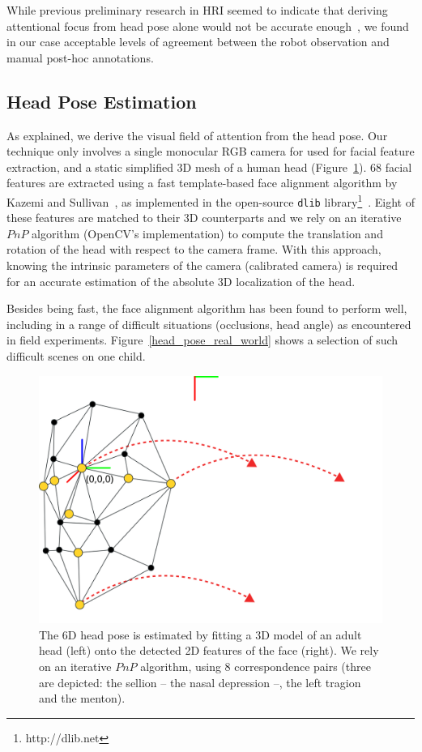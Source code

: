 \documentclass{sig-alternate}
\begin{document}
While previous preliminary research in HRI seemed to indicate that deriving
attentional focus from head pose alone would not be accurate
enough~\cite{kennedy2015head}, we found in our case acceptable levels of
agreement between the robot observation and manual post-hoc annotations.


\subsection{Head Pose Estimation}

As explained, we derive the visual field of attention from the head pose. Our
technique only involves a single monocular RGB camera for used for facial
feature extraction, and a static simplified 3D mesh of a human head
(Figure~\ref{head_pose}). 68 facial features are extracted using a fast
template-based face alignment algorithm by Kazemi and
Sullivan~\cite{kazemi2014one}, as implemented in the open-source {\tt dlib}
library\footnote{http://dlib.net}~\cite{dlib09}.  Eight of these features are
matched to their 3D counterparts and we rely on an iterative $PnP$ algorithm
(OpenCV's implementation) to compute the translation and rotation of the head
with respect to the camera frame. With this approach, knowing the intrinsic
parameters of the camera (calibrated camera) is required for an accurate
estimation of the absolute 3D localization of the head.

Besides being fast, the face alignment algorithm has been found to perform well,
including in a range of difficult situations (occlusions, head angle) as
encountered in field experiments.  Figure~\ref{head_pose_real_world} shows a
selection of such difficult scenes on one child.

\begin{figure}[t]
    \centering
    \includegraphics[width=0.9\linewidth]{head_pose}
    \caption{The 6D head pose is estimated by fitting a 3D model of an
        adult head (left) onto the detected 2D features of the face (right). We
        rely on an iterative $PnP$ algorithm, using 8 correspondence pairs
        (three are depicted: the sellion -- the nasal depression --, the left
        tragion and the menton).}

    \label{head_pose}
\end{figure}
\end{document}
